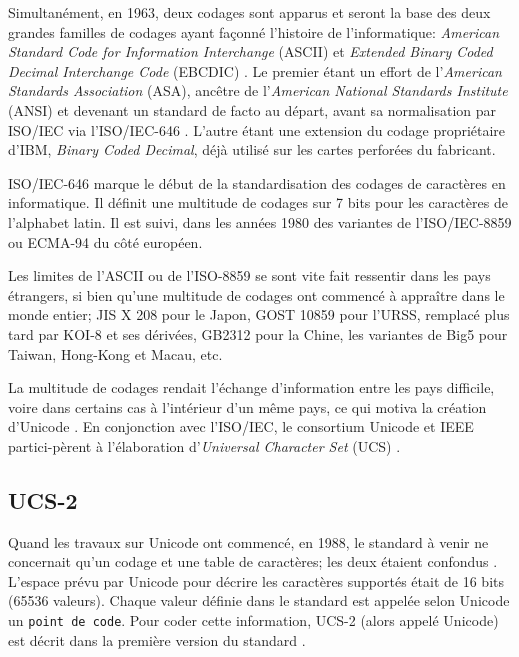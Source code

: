 Simultanément, en 1963, deux codages sont apparus et seront la base des deux grandes
familles de codages ayant façonné l'histoire de l'informatique: \textit{American Standard
Code for Information Interchange} (ASCII) \cite{ASA63} et \textit{Extended Binary Coded Decimal
Interchange Code} (EBCDIC) \cite{amdahl1964architecture}.
Le premier étant un effort de l'\textit{American Standards Association} (ASA), ancêtre de 
l'\textit{American National Standards Institute} (ANSI) et devenant un standard de facto au
départ, avant sa normalisation par ISO/IEC via l'ISO/IEC-646 \cite{ISO72}.
L'autre étant une extension du codage propriétaire d'IBM, \textit{Binary Coded Decimal},
déjà utilisé sur les cartes perforées du fabricant.

ISO/IEC-646 marque le début de la standardisation des codages de caractères en informatique.
Il définit une multitude de codages sur 7 bits pour les caractères de l'alphabet latin.
Il est suivi, dans les années 1980 des variantes de l'ISO/IEC-8859 ou ECMA-94 \cite{ECMA94} du côté européen.

Les limites de l'ASCII ou de l'ISO-8859 se sont vite fait ressentir dans les pays étrangers, si bien
qu'une multitude de codages ont commencé à appraître dans le monde entier; JIS X 208 \cite{JISX208}
pour le Japon, GOST 10859 \cite{GOST64} pour l'URSS, remplacé plus tard par KOI-8 \cite{KOI8} et ses
dérivées, GB2312 \cite{GB2312} pour la Chine, les variantes de Big5 \cite{big5cite} pour Taiwan,
Hong-Kong et Macau, etc.

La multitude de codages rendait l'échange d'information entre les pays difficile, voire dans certains cas
à l'intérieur d'un même pays, ce qui motiva la création d'Unicode \cite{Unicode91}.
En conjonction avec l'ISO/IEC, le consortium Unicode et IEEE partici-pèrent à l'élaboration
d'\textit{Universal Character Set} (UCS) \cite{UCS1993}.

\subsection{UCS-2}

Quand les travaux sur Unicode ont commencé, en 1988, le standard à venir ne concernait
qu'un codage et une table de caractères; les deux étaient confondus \cite{Unicode88}.
L'espace prévu par Unicode pour décrire les caractères supportés était de 16 bits (65536 valeurs).
Chaque valeur définie dans le standard est appelée selon Unicode un \texttt{point de code}.
Pour coder cette information, UCS-2 (alors appelé Unicode) est décrit dans la première version du
standard \cite{Unicode91}.

